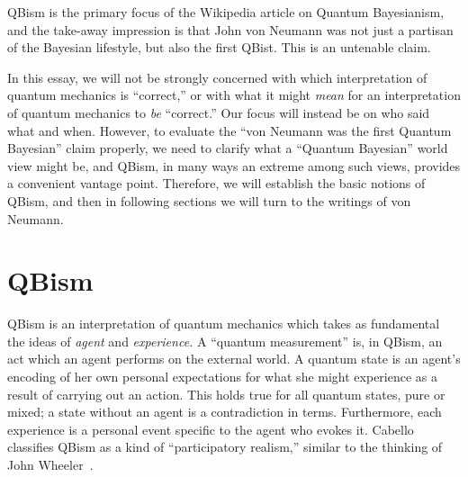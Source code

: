 \documentclass[aps,pra,superscriptaddress,12pt,tightenlines,nofootinbib]{revtex4-2}
\begin{document}
QBism is the primary focus of the Wikipedia article on
Quantum Bayesianism, and the take-away impression is that John von
Neumann was not just a partisan of the Bayesian lifestyle, but also
the first QBist.  This is an untenable claim.

In this essay, we will not be strongly concerned with which
interpretation of quantum mechanics is ``correct,'' or with what it
might \emph{mean} for an interpretation of quantum mechanics to
\emph{be} ``correct.''  Our focus will instead be on who said what and
when.  However, to evaluate the ``von Neumann was the first Quantum
Bayesian'' claim properly, we need to clarify what a ``Quantum
Bayesian'' world view might be, and QBism, in many ways an extreme
among such views, provides a convenient vantage point.  Therefore, we
will establish the basic notions of QBism, and then in following
sections we will turn to the writings of von Neumann.

\section{QBism}
\label{sec:qbism}
QBism is an interpretation of quantum mechanics which takes as
fundamental the ideas of \emph{agent} and \emph{experience.}  A
``quantum measurement'' is, in QBism, an act which an agent performs
on the external world.  A quantum state is an agent's encoding of her
own personal expectations for what she might experience as a result of
carrying out an action.  This holds true for all quantum states, pure
or mixed; a state without an agent is a contradiction in terms.
Furthermore, each experience is a personal event specific to the agent
who evokes it.  Cabello classifies QBism as a kind of ``participatory
realism,'' similar to the thinking of John Wheeler~\cite{Cabello2015}.
\end{document}
